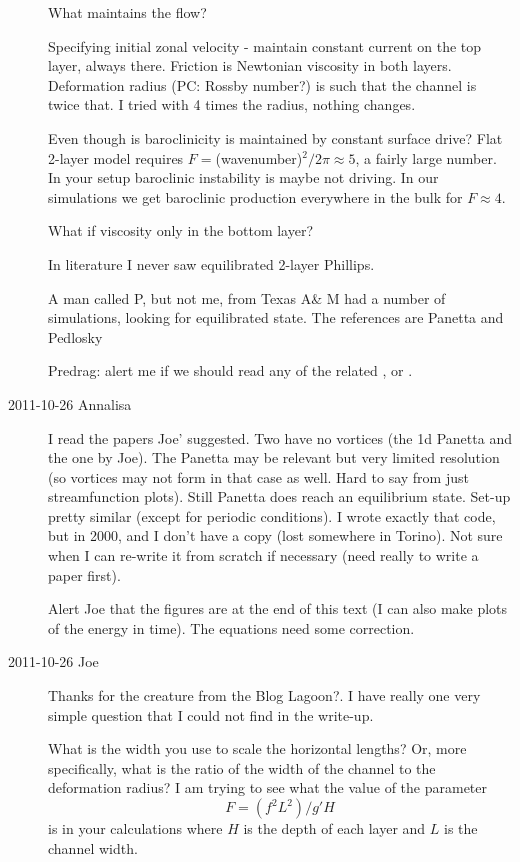 \begin{description}
 What maintains the flow?

 Specifying initial zonal velocity - maintain
constant current on the top layer, always there. Friction is Newtonian
viscosity in both layers. Deformation radius (PC: Rossby number?) is such
that the channel is twice that. I tried with 4 times the radius, nothing
changes.

 Even though is baroclinicity is maintained by constant surface
drive? Flat 2-layer model requires $F = $(wavenumber)$^2/2\pi \approx 5$,
a fairly large number. In your setup baroclinic instability is maybe not
driving. In our simulations we get baroclinic
production everywhere in the bulk for $F \approx 4$.

What if viscosity only in the bottom layer?

 In literature I never saw equilibrated 2-layer Phillips.

 A man called P, but not me, from Texas A\& M had a number of
simulations, looking for equilibrated state. The references are
Panetta and Pedlosky

Predrag: alert me if we should read any of the related
, or
.

\item[2011-10-26 Annalisa]
I read the papers Joe' suggested. Two have no vortices (the 1d
Panetta and the one by Joe). The
Panetta may be relevant but very limited resolution (so
vortices may not form in that case as well. Hard to say from just
streamfunction plots). Still Panetta does reach an equilibrium state.
Set-up pretty similar (except for periodic conditions). I wrote exactly
that code, but in 2000, and I don't have a copy (lost somewhere in
Torino). Not sure when I can re-write it from scratch if necessary (need
really to write a paper first).

Alert Joe that the figures are at the end of this text (I can also make
plots of the energy in time). The equations need some correction.

\item[2011-10-26 Joe]
Thanks for the creature from the Blog Lagoon?. I have really
one very simple question that I could not find in the write-up.

What is the width you use to scale the horizontal lengths? Or, more
specifically, what is the ratio of the width of the channel to the
deformation radius? I am trying to see what the value of the parameter
\[
F= (f^2L^2)/g'H
\]
is in your calculations where $H$ is the depth of each layer and $L$ is
the channel width.


\end{description}
